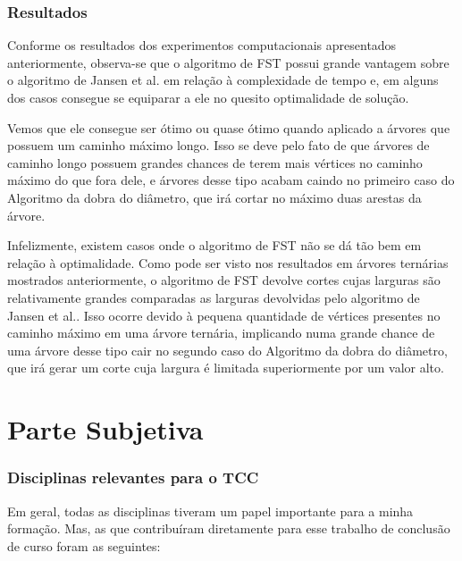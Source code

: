 \documentclass[a4paper,12pt]{article}
\begin{document}

\section {Resultados}
Conforme os resultados dos experimentos computacionais
 apresentados anteriormente, observa-se
que o algoritmo de FST possui grande vantagem sobre o algoritmo
de Jansen et al. em relação à complexidade de tempo e, em alguns 
dos casos consegue se equiparar a ele no quesito optimalidade de
solução.

Vemos que ele consegue ser ótimo ou quase ótimo quando aplicado
a árvores que possuem um caminho máximo longo. 
Isso se deve pelo
fato de que árvores de caminho longo possuem grandes chances
de terem mais vértices no caminho máximo do que fora dele, e
árvores desse tipo acabam caindo no primeiro caso do Algoritmo da 
dobra do diâmetro, que irá cortar no máximo duas arestas da árvore.

Infelizmente, existem casos onde o algoritmo de FST não se dá
tão bem em relação à optimalidade.
Como pode ser visto nos resultados em árvores ternárias mostrados 
anteriormente,
o algoritmo de FST devolve cortes cujas larguras são relativamente
grandes comparadas as larguras devolvidas pelo algoritmo de Jansen
et al.. 
Isso ocorre devido à pequena quantidade de vértices presentes 
no caminho máximo em uma árvore ternária, 
implicando numa grande chance de uma árvore desse tipo cair 
no segundo caso
do Algoritmo da dobra do diâmetro, que irá gerar um corte
cuja largura é
limitada superiormente por um valor alto.

\newpage



\newpage

\part{Parte Subjetiva}
\newpage


\section{Disciplinas relevantes para o TCC}
Em geral, todas as disciplinas tiveram um papel importante
para a minha formação. Mas, as que contribuíram
diretamente para esse trabalho de conclusão de curso
 foram as seguintes:
\end{document}
